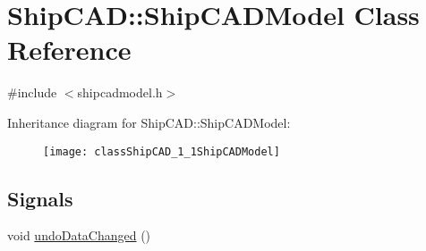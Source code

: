 \hypertarget{classShipCAD_1_1ShipCADModel}{}\section{Ship\+C\+AD\+:\+:Ship\+C\+A\+D\+Model Class Reference}
\label{classShipCAD_1_1ShipCADModel}


{\ttfamily \#include $<$shipcadmodel.\+h$>$}

Inheritance diagram for Ship\+C\+AD\+:\+:Ship\+C\+A\+D\+Model\+:\begin{figure}[H]
\begin{center}
\leavevmode
\texttt{[image: classShipCAD\_1\_1ShipCADModel]}
\end{center}
\end{figure}
\subsection*{Signals}
\begin{DoxyCompactItemize}
\item 
void \hyperlink{classShipCAD_1_1ShipCADModel_a036ed7f2f1f5e592c64ef8f0ccf29204}{undo\+Data\+Changed} ()
\end{DoxyCompactItemize}
